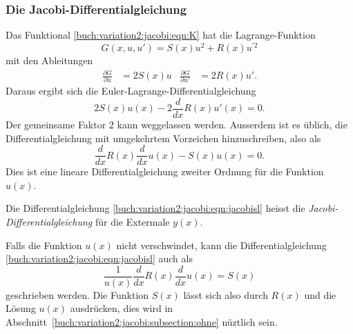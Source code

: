 %
%
\subsubsection{Die Jacobi-Differentialgleichung}
Das Funktional
\eqref{buch:variation2:jacobi:eqn:K}
hat die Lagrange-Funk\-tion 
\[
G(x,u,u') = S(x) u^2 + R(x) u^{\prime 2}
\]
mit den Ableitungen
\begin{align*}
\frac{\partial G}{\partial u}
&=
2S(x) u
&
\frac{\partial G}{\partial u'}
&=
2R(x) u'.
\end{align*}
Daraus ergibt sich die Euler-Lagrange-Differentialgleichung
\[
2S(x) u(x) - 2\frac{d}{dx} R(x) u'(x) = 0.
\]
Der gemeinsame Faktor $2$ kann weggelassen werden.
Ausserdem ist es üblich, die Differentialgleichung mit umgekehrtem
Vorzeichen hinzuschreiben, also als
\begin{equation}
\frac{d}{dx} R(x)\frac{d}{dx} u(x) - S(x) u(x) = 0.
\label{buch:variation2:jacobi:eqn:jacobisl}
\end{equation}
Dies ist eine lineare Differentialgleichung zweiter Ordnung für die Funktion
$u(x)$.

\begin{definition}
Die Differentialgleichung
\eqref{buch:variation2:jacobi:eqn:jacobisl}
heisst die {\em Jacobi-Differentialgleichung}
für die Extermale $y(x)$.
\end{definition}

Falls die Funktion $u(x)$ nicht verschwindet, kann die Differentialgleichung
\eqref{buch:variation2:jacobi:eqn:jacobisl}
auch als
\begin{equation}
\frac{1}{u(x)}
\frac{d}{dx} R(x)\frac{d}{dx} u(x) = S(x)
\label{buch:variation2:jacobi:eqn:jacobisl2}
\end{equation}
geschrieben werden.
Die Funktion $S(x)$ lässt sich also durch $R(x)$ und die Lösung $u(x)$
ausdrücken, dies wird in
Abschnitt~\ref{buch:variation2:jacobi:subsection:ohne}
nüztlich sein.

